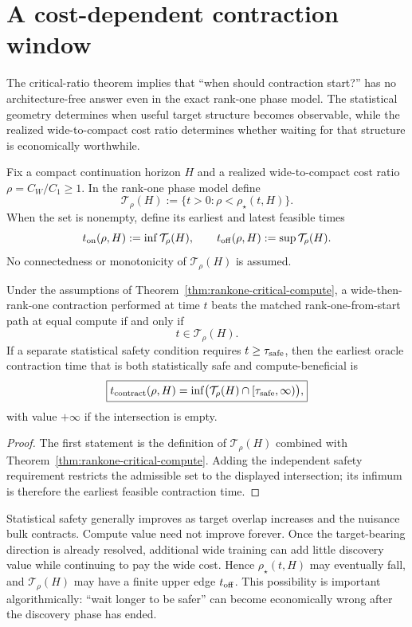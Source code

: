 \section{A cost-dependent contraction window}
The critical-ratio theorem implies that ``when should contraction start?'' has no architecture-free answer even in the exact rank-one phase model. The statistical geometry determines when useful target structure becomes observable, while the realized wide-to-compact cost ratio determines whether waiting for that structure is economically worthwhile.

\begin{definition}\label{def:compute-window}
Fix a compact continuation horizon $H$ and a realized wide-to-compact cost ratio $\rho=C_W/C_1\ge1$. In the rank-one phase model define
\[
\mathcal T_\rho(H)
:=
\{t>0:\rho<\rho_\star(t,H)\}.
\]
When the set is nonempty, define its earliest and latest feasible times
\[
t_{\rm on}(\rho,H):=\inf\mathcal T_\rho(H),
\qquad
 t_{\rm off}(\rho,H):=\sup\mathcal T_\rho(H).
\]
No connectedness or monotonicity of $\mathcal T_\rho(H)$ is assumed.
\end{definition}

\begin{corollary}\label{cor:cost-dependent-onset}
Under the assumptions of Theorem~\ref{thm:rankone-critical-compute}, a wide-then-rank-one contraction performed at time $t$ beats the matched rank-one-from-start path at equal compute if and only if
\[
t\in\mathcal T_\rho(H).
\]
If a separate statistical safety condition requires $t\ge\tau_{\rm safe}$, then the earliest oracle contraction time that is both statistically safe and compute-beneficial is
\[
\boxed{
 t_{\rm contract}(\rho,H)
=
\inf\bigl(\mathcal T_\rho(H)\cap[\tau_{\rm safe},\infty)\bigr),}
\]
with value $+\infty$ if the intersection is empty.
\end{corollary}

\begin{proof}
The first statement is the definition of $\mathcal T_\rho(H)$ combined with Theorem~\ref{thm:rankone-critical-compute}. Adding the independent safety requirement restricts the admissible set to the displayed intersection; its infimum is therefore the earliest feasible contraction time.
\end{proof}

\begin{remark}
Statistical safety generally improves as target overlap increases and the nuisance bulk contracts. Compute value need not improve forever. Once the target-bearing direction is already resolved, additional wide training can add little discovery value while continuing to pay the wide cost. Hence $\rho_\star(t,H)$ may eventually fall, and $\mathcal T_\rho(H)$ may have a finite upper edge $t_{\rm off}$. This possibility is important algorithmically: ``wait longer to be safer'' can become economically wrong after the discovery phase has ended.
\end{remark}

